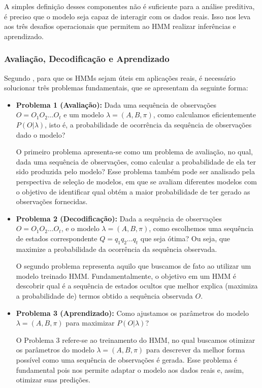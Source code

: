 \documentclass[
    12pt,                %
    openright,           %
    oneside,             %
    a4paper,             %
    english,             %
    brazil               %
]{abntex2}
\begin{document}
A simples definição desses componentes não é suficiente para a análise preditiva, é preciso que o modelo seja capaz de interagir 
com os dados reais. Isso nos leva aos três desafios operacionais que permitem ao HMM realizar inferências e aprendizado.

\subsubsection{Avaliação, Decodificação e Aprendizado}

Segundo , para que os HMMs sejam úteis em aplicações reais, é necessário
solucionar três problemas fundamentais, que se apresentam da seguinte forma:

\begin{itemize}
    \item \textbf{Problema 1 (Avaliação):} Dada uma sequência de observações $O={O_1 O_2 \dots O_t}$ e um 
    modelo $\lambda = (A, B, \pi)$, como calculamos eficientemente $P(O|\lambda)$, isto é, a probabilidade
    de ocorrência da sequência de observações dado o modelo? \cite{Rabiner1989}

    O primeiro problema apresenta-se como um problema de avaliação, no qual, dada uma sequência de observações, como
    calcular a probabilidade de ela ter sido produzida pelo modelo? Esse problema também pode ser analisado pela 
    perspectiva de seleção de modelos, em que se avaliam diferentes modelos com o objetivo de 
    identificar qual obtém a maior probabilidade de ter gerado as observações fornecidas.


    \item \textbf{Problema 2 (Decodificação):} Dada a sequência de observações $O={O_1 O_2 \dots O_t}$, e o modelo $\lambda = (A, B, \pi)$, 
    como escolhemos uma sequência de estados correspondente $Q={q_1 q_2 \dots q_t}$ que seja ótima? Ou seja, que maximize a probabilidade
    da ocorrência da sequência observada. \cite{Rabiner1989}

    O segundo problema representa aquilo que buscamos de fato ao utilizar um modelo treinado HMM. Fundamentalmente, 
    o objetivo em um HMM é descobrir qual é a sequência de estados ocultos que melhor explica (maximiza a probabilidade de) termos 
    obtido a sequência observada $O$.

    \item \textbf{Problema 3 (Aprendizado):} Como ajustamos os parâmetros do modelo $\lambda = (A, B, \pi)$ para maximizar $P(O|\lambda)$? \cite{Rabiner1989}
    
    O Problema 3 refere-se ao treinamento do HMM, no qual buscamos otimizar os parâmetros do modelo $\lambda = (A, B, \pi)$ 
    para descrever da melhor forma possível como uma sequência de observações é gerada. Esse problema é fundamental pois nos permite 
    adaptar o modelo aos dados reais e, assim, otimizar suas predições.

\end{itemize}
\end{document}
